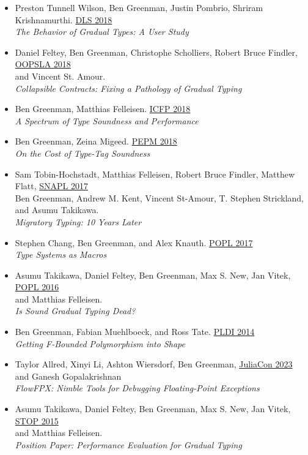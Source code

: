 \documentclass[11pt]{article}
\begin{document}
\begin{itemize}
\item
  Preston Tunnell Wilson, Ben Greenman, Justin Pombrio, Shriram Krishnamurthi. \hfill \href{https://conf.researchr.org/track/dls-2018/dls-2018}{DLS 2018} \\
  \emph{The Behavior of Gradual Types: A User Study}
\item
  Daniel Feltey, Ben Greenman, Christophe Scholliers, Robert Bruce Findler, \hfill \href{https://2018.splashcon.org/track/splash-2018-OOPSLA}{OOPSLA 2018} \\
  and Vincent St. Amour. \\
  \emph{Collapsible Contracts: Fixing a Pathology of Gradual Typing}
\item
  Ben Greenman, Matthias Felleisen. \hfill \href{https://icfp18.sigplan.org/}{ICFP 2018} \\
  \emph{A Spectrum of Type Soundness and Performance}
\item
  Ben Greenman, Zeina Migeed. \hfill \href{https://popl18.sigplan.org/track/PEPM-2018}{PEPM 2018} \\
  \emph{On the Cost of Type-Tag Soundness}
\item
  Sam Tobin-Hochstadt, Matthias Felleisen, Robert Bruce Findler, Matthew Flatt, \hfill \href{https://snapl.org/2017/}{SNAPL 2017} \\
  Ben Greenman, Andrew M. Kent, Vincent St-Amour, T. Stephen Strickland, \\
  and Asumu Takikawa. \\
  \emph{Migratory Typing: 10 Years Later}
\item
  Stephen Chang, Ben Greenman, and Alex Knauth. \hfill \href{https://popl17.sigplan.org/}{POPL 2017} \\
   \emph{Type Systems as Macros}
\item
  Asumu Takikawa, Daniel Feltey, Ben Greenman, Max S. New, Jan Vitek, \hfill \href{https://popl16.sigplan.org/}{POPL 2016} \\
   and Matthias Felleisen. \\
   \emph{Is Sound Gradual Typing Dead?}
\item
  Ben Greenman, Fabian Muehlboeck, and Ross Tate. \hfill \href{https://conferences.inf.ed.ac.uk/pldi2014/}{PLDI 2014} \\
  \emph{Getting F-Bounded Polymorphism into Shape}
\end{itemize}

\begin{itemize}
\item
  Taylor Allred, Xinyi Li, Ashton Wiersdorf, Ben Greenman, \hfill \href{https://juliacon.org/2023/}{JuliaCon 2023} \\
   and Ganesh Gopalakrishnan  \\
   \emph{FlowFPX: Nimble Tools for Debugging Floating-Point Exceptions}
\item
  Asumu Takikawa, Daniel Feltey, Ben Greenman, Max S. New, Jan Vitek, \hfill \href{https://2015.ecoop.org/track/STOP2015}{STOP 2015} \\
   and Matthias Felleisen. \\
   \emph{Position Paper: Performance Evaluation for Gradual Typing}
\end{itemize}
\end{document}
